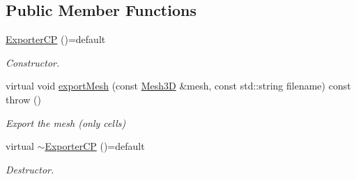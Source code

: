\subsection*{Public Member Functions}
\begin{DoxyCompactItemize}
\item 
\hyperlink{classFVCode3D_1_1ExporterCP_acb1333c76b0f94297d22f1f457ff83bf}{Exporter\+CP} ()=default
\begin{DoxyCompactList}\small\item\em Constructor. \end{DoxyCompactList}\item 
virtual void \hyperlink{classFVCode3D_1_1ExporterCP_a710defb3e6ef55d69fea4833920b755b}{export\+Mesh} (const \hyperlink{classFVCode3D_1_1Mesh3D}{Mesh3D} \&mesh, const std\+::string filename) const   throw ()
\begin{DoxyCompactList}\small\item\em Export the mesh (only cells) \end{DoxyCompactList}\item 
virtual \hyperlink{classFVCode3D_1_1ExporterCP_ab8c6ebe217f72f2fb2e1817279d0b12d}{$\sim$\+Exporter\+CP} ()=default
\begin{DoxyCompactList}\small\item\em Destructor. \end{DoxyCompactList}\end{DoxyCompactItemize}
